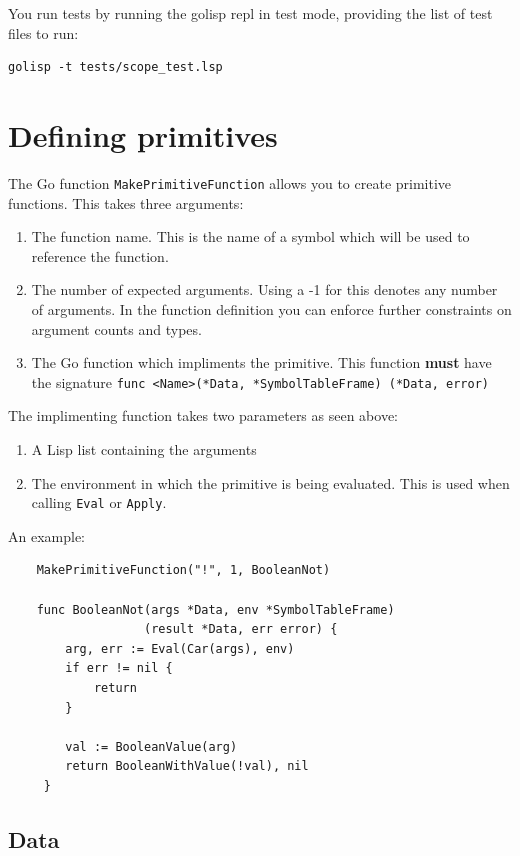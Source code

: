 \documentclass[12pt]{article}
\begin{document}
You run tests by running the golisp repl in test mode, providing the list of test files to run:

\begin{verbatim}
golisp -t tests/scope_test.lsp
\end{verbatim}

\section{Defining primitives}

The Go function \verb|MakePrimitiveFunction| allows you to create
primitive functions. This takes three arguments:

\begin{enumerate}
\item The function name. This is the name of a symbol which will be
  used to reference the function.
\item The number of expected arguments. Using a -1 for this denotes
  any number of arguments. In the function definition you can enforce
  further constraints on argument counts and types.
\item The Go function which impliments the primitive. This function
  {\bf must} have the signature
  \verb|func <Name>(*Data, *SymbolTableFrame) (*Data, error)|
\end{enumerate}

\noindent The implimenting function takes two parameters as seen
above:

\begin{enumerate}
\item A Lisp list containing the arguments
\item The environment in which the primitive
  is being evaluated. This is used when calling \verb|Eval| or \verb|Apply|.
\end{enumerate}

\noindent An example:

\begin{verbatim}
    MakePrimitiveFunction("!", 1, BooleanNot)

    func BooleanNot(args *Data, env *SymbolTableFrame)
                   (result *Data, err error) {
        arg, err := Eval(Car(args), env)
        if err != nil {
            return
        }

        val := BooleanValue(arg)
        return BooleanWithValue(!val), nil
     }
\end{verbatim}

\subsection{Data}
\end{document}
